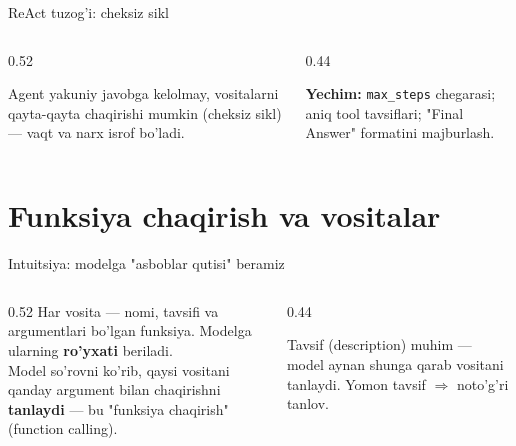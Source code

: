 \documentclass[aspectratio=169,11pt]{beamer}
\begin{document}
\begin{frame}{ReAct tuzog'i: cheksiz sikl}
  \begin{columns}[T]
    \begin{column}{0.52\textwidth}
      \begin{tcolorbox}[warnbox,title={Sikl tugamasligi}]
        \small
        Agent yakuniy javobga kelolmay, vositalarni qayta-qayta chaqirishi
        mumkin (cheksiz sikl) --- vaqt va narx isrof bo'ladi.
      \end{tcolorbox}
    \end{column}
    \begin{column}{0.44\textwidth}
      \begin{tcolorbox}[okbox,top=2pt,bottom=2pt]
        \footnotesize
        \textbf{Yechim:} \texttt{max\_steps} chegarasi; aniq tool tavsiflari;
        "Final Answer" formatini majburlash.
      \end{tcolorbox}
    \end{column}
  \end{columns}
\end{frame}

\section[Tools]{Funksiya chaqirish va vositalar}

\begin{frame}{Intuitsiya: modelga "asboblar qutisi" beramiz}
  \begin{columns}[T]
    \begin{column}{0.52\textwidth}
      \small
      Har vosita --- nomi, tavsifi va argumentlari bo'lgan funksiya. Modelga
      ularning \textbf{ro'yxati} beriladi.\\[5pt]
      Model so'rovni ko'rib, qaysi vositani qanday argument bilan chaqirishni
      \textbf{tanlaydi} --- bu "funksiya chaqirish" (function calling).
    \end{column}
    \begin{column}{0.44\textwidth}
      \begin{tcolorbox}[okbox,top=2pt,bottom=2pt]
        \footnotesize
        Tavsif (description) muhim --- model aynan shunga qarab vositani tanlaydi.
        Yomon tavsif $\Rightarrow$ noto'g'ri tanlov.
      \end{tcolorbox}
    \end{column}
  \end{columns}
\end{frame}
\end{document}

